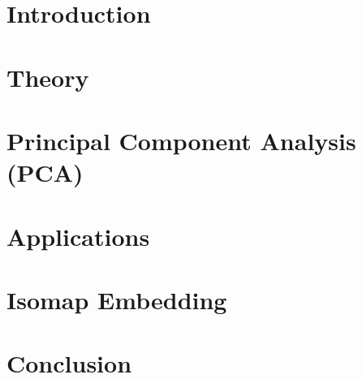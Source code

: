 







 

\begin{titlepage}


\end{titlepage}


\setcounter{savepage}{\value{page}}


\section{Introduction}

\clearpage

\section{Theory}

\clearpage

\section{Principal Component Analysis (PCA)}

\clearpage

\section{Applications}

\clearpage

\section{Isomap Embedding}

\clearpage

\section{Conclusion}

\clearpage

\singlespacing
\appendix
{}
\setcounter{page}{\numexpr\value{savepage}}





